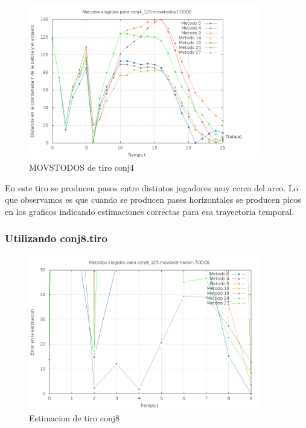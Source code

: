 \begin{figure}[H]
\begin{center}
\includegraphics[width=0.9\textwidth]{img/conj4_125_movstodos_TODOS_elegidos.png}
     \caption{MOVSTODOS de tiro conj4}
\end{center}
\end{figure}

En este tiro se producen pasos entre distintos jugadores muy cerca del arco. Lo que observamos es
que cuando se producen pases horizontales se producen picos en los graficos indicando estimaciones
correctas para esa trayectoria temporal.




\subsubsection{Utilizando conj8.tiro}

\begin{figure}[H]
\begin{center}
\includegraphics[width=0.9\textwidth]{img/conj8_125_movsestimacion_TODOS_elegidos.png}
     \caption{Estimacion de tiro conj8}
\end{center}
\end{figure}


